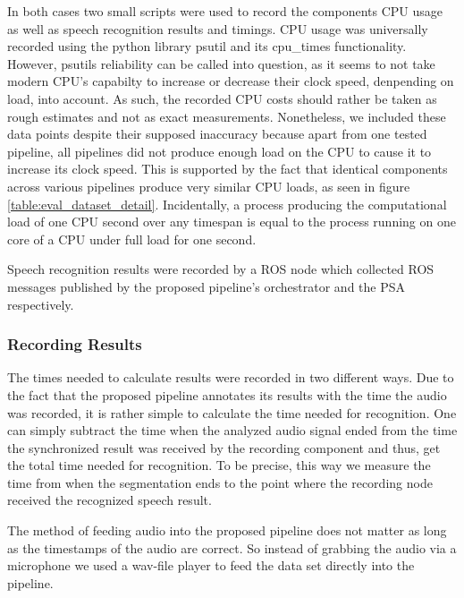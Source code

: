 In both cases two small scripts were used to record the components CPU usage as well as speech recognition results and timings.
CPU usage was universally recorded using the python library psutil \cite{psutil} and its cpu\_times functionality.
However, psutils reliability can be called into question, as it seems to not take modern CPU's capabilty to increase or decrease their clock speed, denpending on load, into account.
As such, the recorded CPU costs should rather be taken as rough estimates and not as exact measurements.
Nonetheless, we included these data points despite their supposed inaccuracy because apart from one tested pipeline, all pipelines did not produce enough load on the CPU to cause it to increase its clock speed.
This is supported by the fact that identical components across various pipelines produce very similar CPU loads, as seen in figure 
\ref{table:eval_dataset_detail}.
Incidentally, a process producing the computational load of one CPU second over any timespan is equal to the process running on one core of a CPU under full load for one second.

Speech recognition results were recorded by a ROS node which collected ROS messages published by the proposed pipeline's orchestrator and the PSA respectively.

\subsubsection{Recording Results}

The times needed to calculate results were recorded in two different ways.
Due to the fact that the proposed pipeline annotates its results with the time the audio was recorded, it is rather simple to calculate the time needed for recognition.
One can simply subtract the time when the analyzed audio signal ended from the time the synchronized result was received by the recording component and thus, get the total time needed for recognition.
To be precise, this way we measure the time from when the segmentation ends to the point where the recording node received the recognized speech result.

The method of feeding audio into the proposed pipeline does not matter as long as the timestamps of the audio are correct.
So instead of grabbing the audio via a microphone we used a wav-file player to feed the data set directly into the pipeline.

